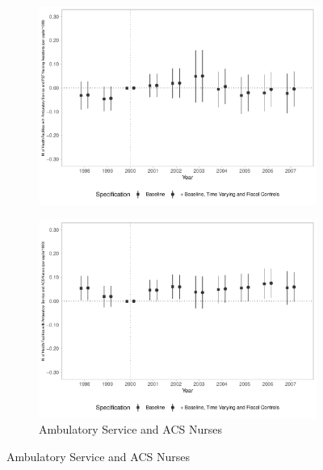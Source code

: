 \begin{figure}[h!]
\begin{center}
\begin{subfigure}{0.32\textwidth}
        \includegraphics[width=\textwidth]{plots/sia_ncnes_outpsf_pcapita_dist_ec29_baseline_dist_ec29_baseline_13.pdf}
    \end{subfigure}
    \begin{subfigure}{0.32\textwidth}
        \centering
        \caption{\scriptsize Ambulatory Service and ACS Nurses}\label{fig:13h}
        \includegraphics[width=\textwidth]{plots/sia_ncnes_enfacs_pcapita_dist_ec29_baseline_dist_ec29_baseline_13.pdf}
    \end{subfigure}
    
    \end{center}
    
\end{figure}